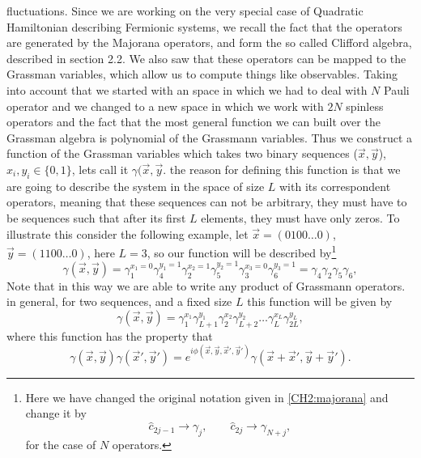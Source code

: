 fluctuations. Since we are working on the very special case of Quadratic Hamiltonian describing Fermionic systems, we recall the fact that the operators are generated by the Majorana operators, and form the so called Clifford algebra, described in section 2.2. We also saw that these operators can be mapped to the Grassman variables, which allow us to compute things like observables. Taking into account that we started with an space in which we had to deal with $N$ Pauli operator and we changed to a new space in which we work with $2N$ spinless operators and the fact that the most general  function we can built over the Grassman algebra is polynomial of the Grassmann variables. Thus we construct a function of the Grassman variables which takes two binary sequences ($\vec{x},\vec{y}$), $x_i,y_i \in \{0,1\}$, lets call it $\gamma(\vec{x},\vec{y}$. the reason for defining this function is that we are going to describe the system in the space of size $L$ with its correspondent operators, meaning that these sequences can not be arbitrary, they must have to be sequences such that after its first $L$ elements, they must have only zeros. To illustrate this consider the following example, let $\vec{x}=(0100\ldots 0)$, $\vec{y}=(1100\ldots 0)$, here $L=3$, so our function will be described by\footnote{Here we have changed the original notation given in \eqref{CH2:majorana} and change it by 
\begin{equation}
\hat{c}_{2j-1}\rightarrow \gamma_{j} , \qquad \hat{c}_{2j}\rightarrow \gamma_{N+j},
\end{equation}
for the case of $N$ operators.
}
\begin{equation}
\gamma(\vec{x},\vec{y}) = \gamma_1^{x_1=0} \gamma_{4}^{y_1=1} \gamma_{2}^{x_2=1} \gamma_{5}^{y_2=1} \gamma_{3}^{x_3=0} \gamma_{6}^{y_3=1} = \gamma_{4}\gamma_{2}\gamma_{5}\gamma_{6},
\end{equation}
Note that in this way we are able to write any product of Grassmann operators. in general, for two sequences, and a fixed size $L$ this function will be given by
\begin{equation}
\gamma(\vec{x},\vec{y}) = \gamma_1^{x_1} \gamma_{L+1}^{y_1} \gamma_{2}^{x_2} \gamma_{L+2}^{y_2}\ldots \gamma_{L}^{x_L} \gamma_{2L}^{y_L},
\end{equation} 
where this function has the property that
\begin{equation}
\gamma(\vec{x},\vec{y})\gamma(\vec{x}',\vec{y}') = e^{i\phi(\vec{x},\vec{y},\vec{x}',\vec{y}')} \gamma(\vec{x}+\vec{x}',\vec{y}+\vec{y}').
\label{CH2:my_relation_delta}
\end{equation}
